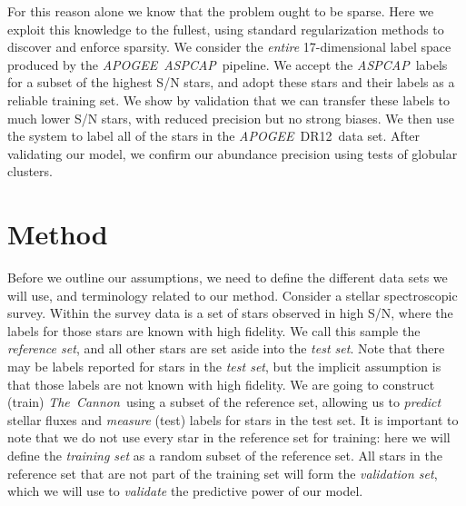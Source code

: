 \documentclass[12pt,preprint]{aastex}
\newcommand{\project}[1]{\textsl{#1}}
\newcommand{\TheCannon}{\project{The~Cannon}}
\newcommand{\acronym}[1]{{\small{#1}}}
\newcommand{\apogee}{\project{\acronym{APOGEE}}}
\newcommand{\aspcap}{\project{\acronym{ASPCAP}}}
\newcommand{\dr}{\acronym{DR12}}
\begin{document}
For this reason alone we know that the problem ought to be sparse.  Here we exploit this 
knowledge to the fullest, using standard regularization methods to discover
and enforce sparsity.  We consider the \emph{entire} 17-dimensional label space 
produced by the \apogee\ \aspcap\ pipeline.  We accept the \aspcap\ labels for 
a subset of the highest S/N stars, and adopt these stars and their labels as a
reliable training set.  We show by validation that we can transfer these labels to much 
lower S/N stars, with reduced precision but no strong biases.  We then use the
system to label all of the stars in the \apogee\ \dr\ data set.  After
validating our model, we confirm our abundance precision using tests of globular
clusters.


\section{Method}


Before we outline our assumptions, we need to define the different data sets we
will use, and terminology related to our method. Consider a stellar spectroscopic
survey.  Within the survey data is a set of stars observed in high S/N, where the labels for those stars are known with high
fidelity.  We call this sample the \emph{reference set}, and all other stars
are set aside into the \emph{test set}.  Note that there may be labels
reported for stars in the \emph{test set}, but the implicit assumption is
that those labels are not known with high fidelity.  We are going to construct
(train) \TheCannon\ using a subset of the reference set, allowing us to 
\emph{predict} stellar fluxes and \emph{measure} (test) labels for stars in the 
test set.  It is important to note that we do not use every star in the
reference set for training: here we will define the \emph{training set} as a random
subset of the reference set.  All stars in the reference set that are not part of 
the training set will form the \emph{validation set}, which we will use to 
\emph{validate} the predictive power of our model.
\end{document}
